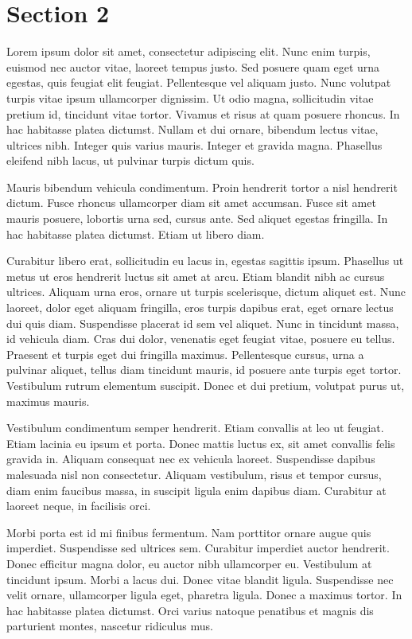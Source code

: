 \section{Section 2}
\label{subsec:sec2}

Lorem ipsum dolor sit amet, consectetur adipiscing elit. Nunc enim turpis, euismod nec auctor vitae, laoreet tempus justo. Sed posuere quam eget urna egestas, quis feugiat elit feugiat. Pellentesque vel aliquam justo. Nunc volutpat turpis vitae ipsum ullamcorper dignissim. Ut odio magna, sollicitudin vitae pretium id, tincidunt vitae tortor. Vivamus et risus at quam posuere rhoncus. In hac habitasse platea dictumst. Nullam et dui ornare, bibendum lectus vitae, ultrices nibh. Integer quis varius mauris. Integer et gravida magna. Phasellus eleifend nibh lacus, ut pulvinar turpis dictum quis.

Mauris bibendum vehicula condimentum. Proin hendrerit tortor a nisl hendrerit dictum. Fusce rhoncus ullamcorper diam sit amet accumsan. Fusce sit amet mauris posuere, lobortis urna sed, cursus ante. Sed aliquet egestas fringilla. In hac habitasse platea dictumst. Etiam ut libero diam.

Curabitur libero erat, sollicitudin eu lacus in, egestas sagittis ipsum. Phasellus ut metus ut eros hendrerit luctus sit amet at arcu. Etiam blandit nibh ac cursus ultrices. Aliquam urna eros, ornare ut turpis scelerisque, dictum aliquet est. Nunc laoreet, dolor eget aliquam fringilla, eros turpis dapibus erat, eget ornare lectus dui quis diam. Suspendisse placerat id sem vel aliquet. Nunc in tincidunt massa, id vehicula diam. Cras dui dolor, venenatis eget feugiat vitae, posuere eu tellus. Praesent et turpis eget dui fringilla maximus. Pellentesque cursus, urna a pulvinar aliquet, tellus diam tincidunt mauris, id posuere ante turpis eget tortor. Vestibulum rutrum elementum suscipit. Donec et dui pretium, volutpat purus ut, maximus mauris.

Vestibulum condimentum semper hendrerit. Etiam convallis at leo ut feugiat. Etiam lacinia eu ipsum et porta. Donec mattis luctus ex, sit amet convallis felis gravida in. Aliquam consequat nec ex vehicula laoreet. Suspendisse dapibus malesuada nisl non consectetur. Aliquam vestibulum, risus et tempor cursus, diam enim faucibus massa, in suscipit ligula enim dapibus diam. Curabitur at laoreet neque, in facilisis orci.

Morbi porta est id mi finibus fermentum. Nam porttitor ornare augue quis imperdiet. Suspendisse sed ultrices sem. Curabitur imperdiet auctor hendrerit. Donec efficitur magna dolor, eu auctor nibh ullamcorper eu. Vestibulum at tincidunt ipsum. Morbi a lacus dui. Donec vitae blandit ligula. Suspendisse nec velit ornare, ullamcorper ligula eget, pharetra ligula. Donec a maximus tortor. In hac habitasse platea dictumst. Orci varius natoque penatibus et magnis dis parturient montes, nascetur ridiculus mus.

